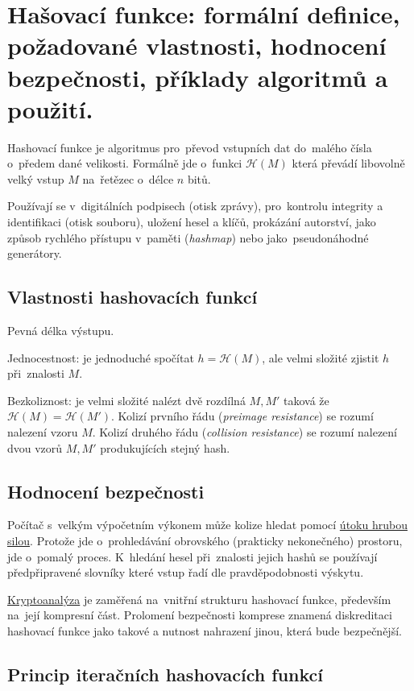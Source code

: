 \clearpage
\section{Hašovací funkce: formální definice, požadované vlastnosti, hodnocení bezpečnosti, příklady algoritmů a použití.}

Hashovací funkce je algoritmus pro~převod vstupních dat do~malého čísla o~předem dané velikosti.
Formálně jde o~funkci $\mathcal{H}(M)$ která převádí libovolně velký vstup $M$ na~řetězec o~délce $n$ bitů.

Používají se v~digitálních podpisech (otisk zprávy), pro~kontrolu integrity a identifikaci (otisk souboru), uložení hesel a klíčů, prokázání autorství, jako způsob rychlého přístupu v~paměti (\emph{hashmap}) nebo jako~pseudonáhodné generátory.


\subsection{Vlastnosti hashovacích funkcí}

Pevná délka výstupu.

Jednocestnost: je jednoduché spočítat $h = \mathcal{H}(M)$, ale velmi složité zjistit $h$ při~znalosti $M$.

Bezkoliznost: je velmi složité nalézt dvě rozdílná $M, M'$ taková že $\mathcal{H}(M) = \mathcal{H}(M')$.
Kolizí prvního řádu (\emph{preimage resistance}) se rozumí nalezení vzoru $M$.
Kolizí druhého řádu (\emph{collision resistance}) se rozumí nalezení dvou vzorů $M, M'$ produkujících stejný hash.


\subsection{Hodnocení bezpečnosti}

Počítač s~velkým výpočetním výkonem může kolize hledat pomocí \uline{útoku hrubou silou}.
Protože jde o~prohledávání obrovského (prakticky nekonečného) prostoru, jde o~pomalý proces.
K~hledání hesel při~znalosti jejich hashů se používají předpřipravené slovníky které vstup řadí dle pravděpodobnosti výskytu.

\uline{Kryptoanalýza} je zaměřená na~vnitřní strukturu hashovací funkce, především na~její kompresní část.
Prolomení bezpečnosti komprese znamená diskreditaci hashovací funkce jako takové a nutnost nahrazení jinou, která bude bezpečnější.


\subsection{Princip iteračních hashovacích funkcí}

